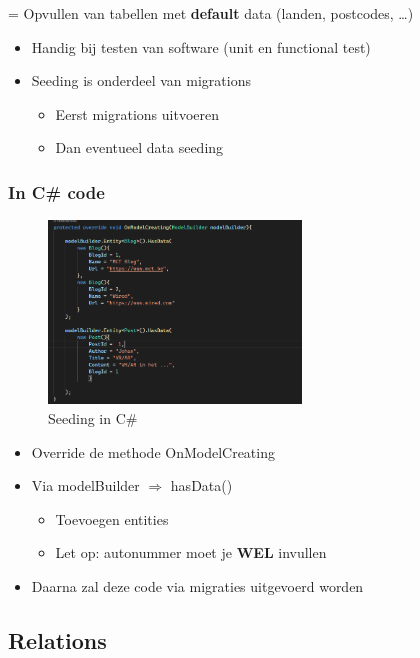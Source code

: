 \documentclass{article}
\begin{document}
= Opvullen van tabellen met \textbf{default} data (landen, postcodes, \dots)

\begin{itemize}
    \item Handig bij testen van software (unit en functional test)
    \item Seeding is onderdeel van migrations
    \begin{itemize}
        \item Eerst migrations uitvoeren
        \item Dan eventueel data seeding
    \end{itemize}
\end{itemize}

\subsubsection{In C\# code}

\begin{figure}[H]
    \centering
    \includegraphics[width=0.6\textwidth]{efcore-seeding.png}
    \caption{Seeding in C\#}
\end{figure}


\begin{itemize}
    \item Override de methode OnModelCreating
    \item Via modelBuilder $\Rightarrow$ hasData()
    \begin{itemize}
        \item Toevoegen entities
        \item Let op: autonummer moet je \textbf{WEL} invullen
    \end{itemize}
    \item Daarna zal deze code via migraties uitgevoerd worden
\end{itemize}

\subsection{Relations}
\end{document}
